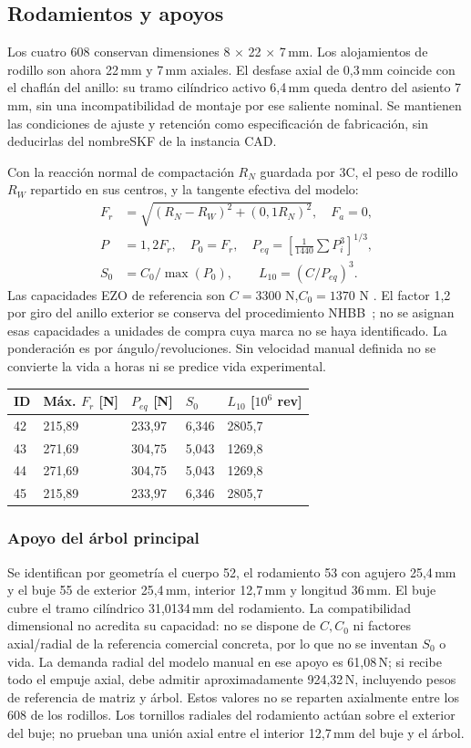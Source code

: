\subsection{Rodamientos y apoyos}
\label{app:prototipo_A5}
Los cuatro 608 conservan dimensiones 8 $\times$ 22 $\times$ 7\,mm. Los alojamientos
de rodillo son ahora 22\,mm y 7\,mm axiales. El desfase axial de 0,3\,mm coincide
con el chaflán del anillo: su tramo cilíndrico activo 6,4\,mm queda dentro
del asiento 7\,mm, sin una incompatibilidad de montaje por ese saliente nominal.
Se mantienen las condiciones de ajuste y retención como especificación
de fabricación, sin deducirlas del nombreSKF de la instancia CAD.

Con la reacción normal de compactación $R_N$ guardada por 3C, el peso de
rodillo $R_W$ repartido en sus centros, y la tangente efectiva del modelo:
\begin{align}
 F_r&=\sqrt{(R_N-R_W)^2+(0,1R_N)^2},\quad F_a=0,\\
 P&=1,2F_r,\quad P_0=F_r,\quad
 P_{eq}=\left[\frac 1{1440}\sum P_i^3\right]^{1/3},\\
 S_0&=C_0/\max(P_0),\qquad L_{10}=(C/P_{eq})^3.
\end{align}
Las capacidades EZO de referencia son $C=3300$ N,$C_0=1370$ N
\cite{ezo_608zz_2026}. El factor 1,2 por giro del anillo exterior se conserva
del procedimiento NHBB~\cite{nhbb_vida_exterior_2026}; no se asignan esas
capacidades a unidades de compra cuya marca no se haya identificado.
La ponderación es por ángulo/revoluciones. Sin velocidad manual definida
no se convierte la vida a horas ni se predice vida experimental.
\begin{center}\begin{tabular}{lllll}\toprule
ID & Máx. $F_r$ [N] & $P_{eq}$ [N] & $S_0$ & $L_{10}$ [$10^6$ rev]\\\midrule
42 & 215,89 & 233,97 & 6,346 & 2805,7\\
43 & 271,69 & 304,75 & 5,043 & 1269,8\\
44 & 271,69 & 304,75 & 5,043 & 1269,8\\
45 & 215,89 & 233,97 & 6,346 & 2805,7\\
\bottomrule\end{tabular}\end{center}

\subsubsection*{Apoyo del árbol principal}
Se identifican por geometría el cuerpo 52, el rodamiento 53 con agujero 25,4\,mm
y el buje 55 de exterior 25,4\,mm, interior 12,7\,mm y longitud 36\,mm. El buje cubre
el tramo cilíndrico 31,0134\,mm del rodamiento. La compatibilidad dimensional
no acredita su capacidad: no se dispone de $C,C_0$ ni factores axial/radial
de la referencia comercial concreta, por lo que no se inventan $S_0$ o vida.
La demanda radial del modelo manual en ese apoyo es 61,08\,N;
si recibe todo el empuje axial, debe admitir aproximadamente 924,32\,N,
incluyendo pesos de referencia de matriz y árbol. Estos valores no se
reparten axialmente entre los 608 de los rodillos. Los tornillos radiales
del rodamiento actúan sobre el exterior del buje; no prueban una unión
axial entre el interior 12,7\,mm del buje y el árbol.
